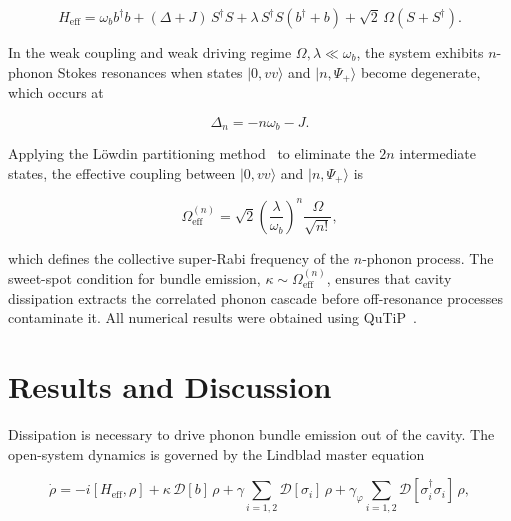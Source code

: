 \documentclass{ws-ijmpb}
\begin{document}
\begin{equation}
	H_\mathrm{eff} = \omega_b b^\dagger b + (\Delta + J)\,S^\dagger S
	+ \lambda\,S^\dagger S(b^\dagger + b) + \sqrt{2}\,\Omega\!\left(S + S^\dagger\right).
	\label{eq:Heff}
\end{equation}

In the weak coupling and weak driving regime $\Omega, \lambda \ll \omega_b$, the system exhibits
$n$-phonon Stokes resonances when states $|0, vv\rangle$ and $|n, \Psi_+\rangle$ become
degenerate, which occurs at

\begin{equation}
	\Delta_n = -n\omega_b - J.
	\label{eq:res}
\end{equation}

Applying the L\"owdin partitioning method~\cite{lowdin1951} to eliminate the $2n$ intermediate
states, the effective coupling between $|0, vv\rangle$ and $|n, \Psi_+\rangle$ is

\begin{equation}
	\Omega_\mathrm{eff}^{(n)} = \sqrt{2}\left(\frac{\lambda}{\omega_b}\right)^{\!n}
	\frac{\Omega}{\sqrt{n!}},
	\label{eq:Oeff}
\end{equation}

which defines the collective super-Rabi frequency of the $n$-phonon process. The sweet-spot
condition for bundle emission, $\kappa \sim \Omega_\mathrm{eff}^{(n)}$, ensures that cavity
dissipation extracts the correlated phonon cascade before off-resonance processes contaminate it. All numerical results were obtained using QuTiP~\cite{johansson2011}.

\section{Results and Discussion}
\label{sec:results}
\graphicspath{{../../codes/results/oficial/pgf/}{../../codes/results/oficial/}}

Dissipation is necessary to drive phonon bundle emission out of the cavity. The open-system 
dynamics is governed by the Lindblad master equation

\begin{equation}
	\dot{\rho} = -i[H_\mathrm{eff},\rho]
	+ \kappa\,\mathcal{D}[b]\,\rho
	+ \gamma\sum_{i=1,2}\mathcal{D}[\sigma_i]\,\rho
	+ \gamma_\varphi\sum_{i=1,2}\mathcal{D}[\sigma_i^\dagger\sigma_i]\,\rho,
	\label{eq:lindblad}
\end{equation}
\end{document}
